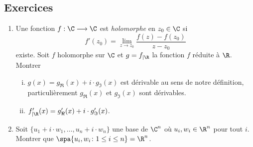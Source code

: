 









\subsection*{Exercices} 

\begin{enumerate}
\item Une fonction $f:\C \longrightarrow \C$ est \emph{holomorphe} en $z_0 \in \C$ si
  \begin{displaymath}
    f'(z_0) = \lim_{z \rightarrow z_0} \frac{f(z) - f(z_0)}{z - z_0} 
  \end{displaymath}
existe. Soit $f$ holomorphe sur $\C$ et $g = f_{|\R}$ la fonction $f$ réduite à $\R$. 
 Montrer 
\begin{enumerate}[i)]
\item  $g(x) = g_\Re(x) + i \cdot g_\Im(x)$ est dérivable au  sens de notre définition, particulièrement $g_\Re(x)$ et $ g_\Im(x)$ sont dérivables. 
\item $f'_{| \R} (x) = g'_\Re(x) + i \cdot g'_\Im(x)$. 
\end{enumerate}
\item Soit $\{u_1+ i \cdot w_1,\dots,u_n + i \cdot w_n\}$ une base de $\C^n$ où $u_i,w_i \in \R^n$  pour tout $i$. Montrer que $\spa\{u_i, w_i \colon 1 \leq i \leq n\} = \R^n$. \label{el:item:5}
\end{enumerate}






